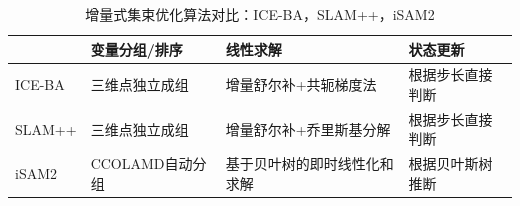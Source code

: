 \begin{table}[htb!]
    \centering
    \caption{增量式集束优化算法对比：ICE-BA，SLAM++，iSAM2}
    \vspace{6pt}
    \begin{tabularx}{\textwidth}{lXXX}
               & 变量分组/排序   & 线性求解                     & 状态更新          \\ \hline
        ICE-BA & 三维点独立成组  & 增量舒尔补+共轭梯度法        & 根据步长直接判断  \\
        SLAM++ & 三维点独立成组  & 增量舒尔补+乔里斯基分解      & 根据步长直接判断  \\
        iSAM2  & CCOLAMD自动分组 & 基于贝叶树的即时线性化和求解 & 根据贝叶斯树推断  \\
    \end{tabularx}
    \label{tab:comp}
\end{table}
